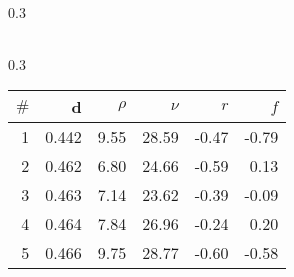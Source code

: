 \documentclass[uplatex,11pt,openany]{ujreport}
\begin{document}
\begin{landscape}
\begin{table*}[tb]
\begin{subtable}[h]{0.3\textwidth}
\begin{tabular}{rrrrrr}
                    \bottomrule
                    \end{tabular}
                    \end{subtable}\hfill\begin{subtable}[h]{0.3\textwidth}
                    \centering
                    \caption{APS}
                    \label{table:best_genes_for_aps}
                    \begin{tabular}{rrrrrr}
                    \toprule
                    $\#$ & d & $\rho$ & $\nu$ & $r$ & $f$ \\
                    \midrule
                    \color{black} 1 & \color{black} 0.442 & {\cellcolor[HTML]{D2EED4}} \color[HTML]{000000} \color{black} 9.55 & {\cellcolor[HTML]{9CDAA0}} \color[HTML]{000000} \color{black} 28.59 & {\cellcolor[HTML]{FEDEDE}} \color[HTML]{000000} \color{black} -0.47 & {\cellcolor[HTML]{FFF2F2}} \color[HTML]{000000} \color{black} -0.79 \\
                    \color{black} 2 & \color{black} 0.462 & {\cellcolor[HTML]{E1F4E2}} \color[HTML]{000000} \color{black} 6.80 & {\cellcolor[HTML]{9CDAA0}} \color[HTML]{000000} \color{black} 24.66 & {\cellcolor[HTML]{FEE5E5}} \color[HTML]{000000} \color{black} -0.59 & {\cellcolor[HTML]{FDBABA}} \color[HTML]{000000} \color{black} 0.13 \\
                    \color{black} 3 & \color{black} 0.463 & {\cellcolor[HTML]{DFF3E0}} \color[HTML]{000000} \color{black} 7.14 & {\cellcolor[HTML]{9CDAA0}} \color[HTML]{000000} \color{black} 23.62 & {\cellcolor[HTML]{FED9D9}} \color[HTML]{000000} \color{black} -0.39 & {\cellcolor[HTML]{FEC7C7}} \color[HTML]{000000} \color{black} -0.09 \\
                    \color{black} 4 & \color{black} 0.464 & {\cellcolor[HTML]{DBF2DD}} \color[HTML]{000000} \color{black} 7.84 & {\cellcolor[HTML]{9CDAA0}} \color[HTML]{000000} \color{black} 26.96 & {\cellcolor[HTML]{FED1D1}} \color[HTML]{000000} \color{black} -0.24 & {\cellcolor[HTML]{FDB5B5}} \color[HTML]{000000} \color{black} 0.20 \\
                    \color{black} 5 & \color{black} 0.466 & {\cellcolor[HTML]{D2EED3}} \color[HTML]{000000} \color{black} 9.75 & {\cellcolor[HTML]{9CDAA0}} \color[HTML]{000000} \color{black} 28.77 & {\cellcolor[HTML]{FEE6E6}} \color[HTML]{000000} \color{black} -0.60 & {\cellcolor[HTML]{FEE5E5}} \color[HTML]{000000} \color{black} -0.58 \\
                    \bottomrule
                    \end{tabular}

\end{subtable}
\end{table*}
\end{landscape}
\end{document}
